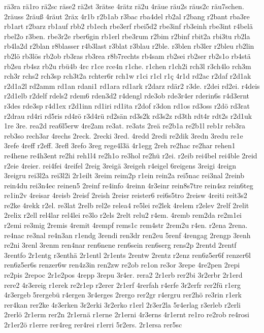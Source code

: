 {rä3ra
rä1ro
rä2sc
räse2
rä2st
3rätse
4rätz
rä2u
4räue
räu2s
räus2c
räu7schen.
2räuss
2räuß
4räut
2räx
4r1b
r2b1ab
r3bac
rba4del
rb2al
r2bang
r2bant
rba3re
rb1art
r2barz
rb1auf
rbb2
rb1ech
rbe3erf
rbei5d2
rbe3inf
rb3einh
rbe3int
r4belä
rbel2o
r3ben.
rbe3r2e
rber6gin
rb1erl
rbe3rum
r2bim
r2binf
rbit2a
rbi3tu
rb2la
rb4la2d
r2blan
r8blasser
r4b3last
r3blat
r3blau
r2ble.
r3blen
rb3ler
r2bleu
rb2lin
rb2lö
rb3lös
rb2ob
rb3ras
rb3rea
r8b7rechts
rb4sam
rb2sei
rb2ser
rb2s1o
rb4stä
rb2su
rb4sz
rb2u
rbü4b
4rc
r1ce
rce4n
r1che.
r1chen
r1ch2i
rch3l
r3ch4lo
rch3m
rch3r
rchs2
rch3sp
rch3t2a
rchter6r
rch1w
r1ci
r1cl
r1ç
4r1d
rd2ac
r2daf
r2d1ak
r2d1a2l
rd2amm
rd1an
rdani1
rd1ara
rd1ark
r2darz
rdär2
r3de.
r2dei
rd2ei.
r4deis
r2d1elb
r2delf
rdels2
rdem6
rden3d2
r4dengl
rde3ob
rde3r4er
rderin6s
r4d3ernt
r3des
rde3sp
r4d1ex
r2d1inn
rd1iri
rd1ita
r2dof
r3don
rd1os
rd3oss
r2dö
rd3rat
r2drau
rd4ri
rd5ris
rd4rö
r3d4rü
rd2sän
rd3s2k
rd3s2z
rd3th
rdt4r
rdt2s
r2d1uk
1re
3re.
rea2d
rea6l5erw
4re2am
re3at.
re3ats
2reä
re2b1a
re2b1l
reb1r
reb3ra
reb3so
rech3ar
4rechs
2reck.
2recki
3red.
4redd
2redi
re2dik
3redn
3redu
re1e
3refe
4reff
r2eff.
3refl
3refo
3reg
rege4l3ä
4r1egg
2reh
re2hac
re2har
rehen1
re4hene
re4h3ent
re2hi
reh1l4
re2h1o
re3hol
re2hü
r2ei.
r2eib
rei4bel
rei4ble
2reid
r2eie
4reier.
rei4fei
4reifel
2reig
3reigä
3reigeh
r4eigel
6reigens
3reigi
4reign
3reigru
rei3l2a
rei3l2i
2r1eilt
3reim
reim2p
r1ein
rein2a
rei5nac
rei3nal
2reinb
rein4du
rei3n4ec
reinen5
2reinf
re4info
4reinn
4r3einr
rein8s7tre
rein4sz
rein6teg
re1in2v
4reisar
4reisb
2reisf
2reish
2reisr
reister6
rei6s5tro
2reisw
4reiti
reit3s2
re2ke
4rekk
r2el.
re3lat
2relb
rel2e
relea4
re5lei
re2lek
4relem
r2elev
2relf
2relit
2relix
r2ell
rel4lar
rel4lei
re3lo
r2els
2relt
relu2
r4em.
4remb
rem2da
re2m1ei
r2emi
re3mig
2remis
4remit
4rempf
rems1c
rem4str
2rem2u
r4en.
r2ena
2rena.
re4nac
re3nal
re4n3an
r1endg
3rendi
ren3dr
ren2eu
5renf
4rengag
2rengp
3renh
re2ni
3renl
3renm
ren4nar
ren6nene
ren6sein
ren6serg
rens2p
2rentd
2rentf
3rentfo
2r1entg
r3enthä
2r1entl
2r1ents
2rentw
2rentz
r2enz
ren6z5er6f
renzer6l
ren6z5er6s
renzer6w
ren4z3in
ren2zw
re2ob
re1on
re3or
3repe
4re2pen
2repi
re2pis
2repoc
2r1e2pos
4repp
3repu
3r4er.
rera2
2r1erb
rer2bi
3r2erbr
2r1erd
rere2
4r3ereig
r1erek
re2r1ep
r2erer
2r1erf
4rerfah
r4erfe
3r2erfr
rer2fü
r1erg
4r3ergeb
5rergebü
r4ergen
3r4erges
2rergo
rer2gr
r4ergru
rer2hö
re3rin
r1erk
rer4kan
rer2ke
4r3erken
3r2erki
3r2erko
r1erl
2r3er2la
5r4erlag
r3erleb
r2erli
2rerlö
2r1erm
rer2n
2r1ernä
r1erne
2r1erni
4r3erns
4r1ernt
re1ro
re2rob
re4rosi
2r1er2ö
r1erre
rer4reg
rer4rei
r1erri
5r2ers.
2r1ersa
rer5sc
}
